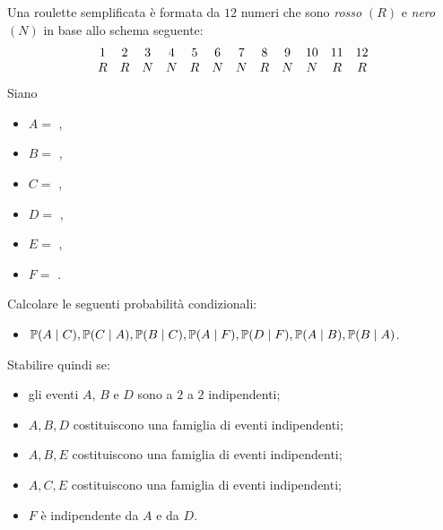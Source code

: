 \Esercizio{}

Una roulette semplificata è formata da $12$ numeri che sono \emph{rosso} $(R)$ e \emph{nero} $(N)$ in base allo schema seguente:
\begin{equation*}
	\begin{array}{ c c c c c c c c c c c c }
		1 & 2 & 3 & 4 & 5 & 6 & 7 & 8 & 9 & 10 & 11 & 12\\
		R & R & N & N & R & N & N & R & N & N  & R  & R
	\end{array}
\end{equation*}
Siano
\begin{itemize}
	\item $A=$ ,
	\item $B=$ ,
	\item $C=$ ,
	\item $D=$ ,
	\item $E=$ ,
	\item $F=$ .
\end{itemize}
Calcolare le seguenti probabilità condizionali:
\begin{itemize}
	\item $\mathbb{P}(A\mid C) ,\mathbb{P}(C\mid A) ,\mathbb{P}(B\mid C) ,\mathbb{P}(A\mid F) ,\mathbb{P}(D\mid F) ,\mathbb{P}(A\mid B) ,\mathbb{P}(B\mid A)$.
\end{itemize}
Stabilire quindi se:
\begin{itemize}
	\item gli eventi $A$, $B$ e $D$ sono a $2$ a $2$ indipendenti;
	\item $A,B,D$ costituiscono una famiglia di eventi indipendenti;
	\item $A,B,E$ costituiscono una famiglia di eventi indipendenti;
	\item $A,C,E$ costituiscono una famiglia di eventi indipendenti;
	\item $F$ è indipendente da $A$ e da $D$.
\end{itemize}

\Esercizio{}

